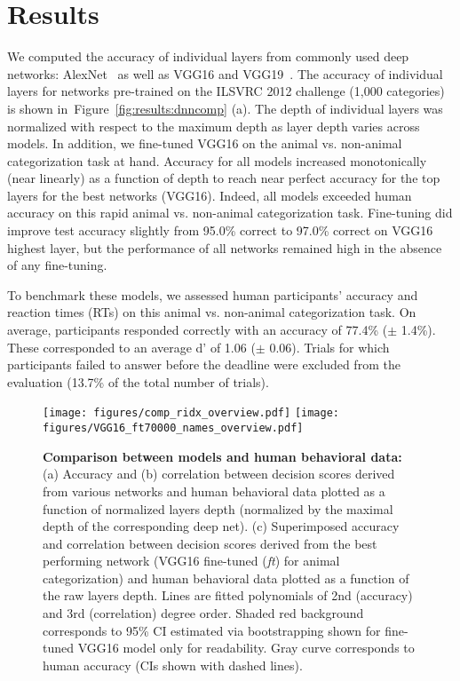 \documentclass{article}
\begin{document}
\section{Results}

We computed the accuracy of individual layers from commonly used deep networks: AlexNet~\citep{Krizhevsky2012} as well as VGG16 and VGG19~\citep{Simonyan2014a}. The accuracy of individual layers for networks pre-trained on the ILSVRC 2012 challenge (1,000 categories) is shown in~Figure~\ref{fig:results:dnncomp} (a). The depth of individual layers was normalized with respect to the maximum depth as layer depth varies across models. In addition, we fine-tuned VGG16 on the animal vs. non-animal categorization task at hand. Accuracy for all models increased monotonically (near linearly) as a function of depth to reach near perfect accuracy for the top layers for the best networks (VGG16). Indeed, all models exceeded human accuracy on this rapid animal vs. non-animal categorization task. Fine-tuning did improve test accuracy slightly from 95.0\% correct to 97.0\% correct on VGG16 highest layer, but the performance of all networks remained high in the absence of any fine-tuning.



To benchmark these models, we assessed human participants' accuracy and reaction times (RTs) on this animal vs. non-animal categorization task. On average, participants responded correctly with an accuracy of 77.4\% ($\pm$ 1.4\%). These corresponded to an average d' of 1.06 ($\pm$ 0.06). Trials for which participants failed to answer before the deadline were excluded from the evaluation (13.7\% of the total number of trials). 


\begin{figure}[t!]
  \begin{center}\vspace{-2.2cm}
    \texttt{[image: figures/comp\_ridx\_overview.pdf]}\vspace{-2mm}
    \texttt{[image: figures/VGG16\_ft70000\_names\_overview.pdf]}\vspace{-4mm}
    \caption[Model accuracy and correlation with human observers]{\textbf{Comparison between models and human behavioral data:} (a) Accuracy and (b) correlation between decision scores derived from various networks and human behavioral data plotted as a function of normalized layers depth (normalized by the maximal depth of the corresponding deep net). (c) Superimposed accuracy and correlation between decision scores derived from the best performing network (VGG16 fine-tuned (\emph{ft}) for animal categorization) and human behavioral data plotted as a function of the raw layers depth. Lines are fitted polynomials of 2nd (accuracy) and 3rd (correlation) degree order. Shaded red background corresponds to 95\% CI estimated via bootstrapping shown for fine-tuned VGG16 model only for readability. Gray curve corresponds to human accuracy (CIs shown with dashed lines).}
    \label{fig:results:dnncomp}\label{fig:results:vgg16}
  \end{center}
\end{figure}
\end{document}
